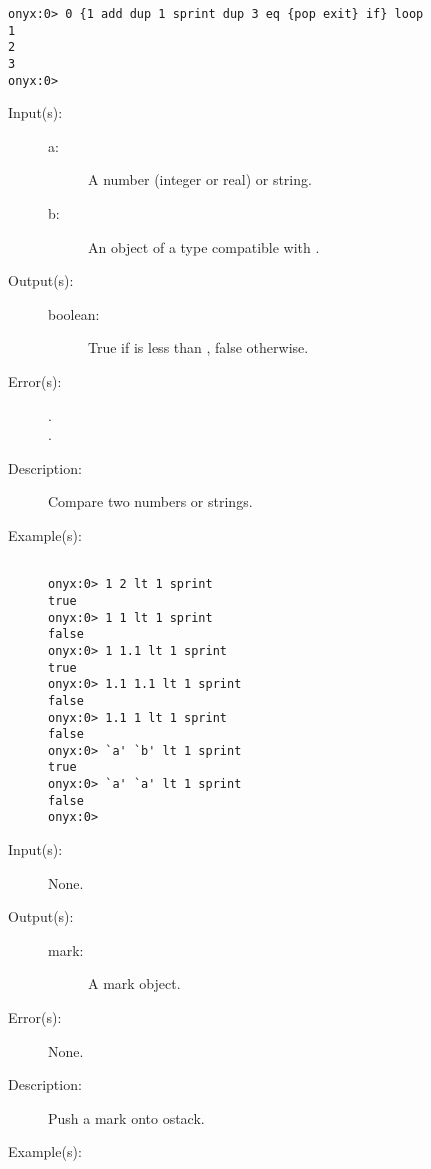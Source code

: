 \begin{description}
\begin{description}
\begin{verbatim}
onyx:0> 0 {1 add dup 1 sprint dup 3 eq {pop exit} if} loop
1
2
3
onyx:0>
		\end{verbatim}
	\end{description}
\label{systemdict:lt}
\item[{\onyxop{a b}{lt}{boolean}}: ]
	\begin{description}\item[]
	\item[Input(s): ]
		\begin{description}\item[]
		\item[a: ]
			A number (integer or real) or string.
		\item[b: ]
			An object of a type compatible with .
		\end{description}
	\item[Output(s): ]
		\begin{description}\item[]
		\item[boolean: ]
			True if  is less than , false
			otherwise.
		\end{description}
	\item[Error(s): ]
		\begin{description}\item[]
		\item[.]
		\item[.]
		\end{description}
	\item[Description: ]
		Compare two numbers or strings.
	\item[Example(s): ]\begin{verbatim}

onyx:0> 1 2 lt 1 sprint
true
onyx:0> 1 1 lt 1 sprint
false
onyx:0> 1 1.1 lt 1 sprint
true
onyx:0> 1.1 1.1 lt 1 sprint
false
onyx:0> 1.1 1 lt 1 sprint
false
onyx:0> `a' `b' lt 1 sprint
true
onyx:0> `a' `a' lt 1 sprint
false
onyx:0>
		\end{verbatim}
	\end{description}
\label{systemdict:mark}
\item[{\onyxop{--}{mark}{mark}}: ]
	\begin{description}\item[]
	\item[Input(s): ] None.
	\item[Output(s): ]
		\begin{description}\item[]
		\item[mark: ]
			A mark object.
		\end{description}
	\item[Error(s): ] None.
	\item[Description: ]
		Push a mark onto ostack.
	\item[Example(s): ]\begin{verbatim}


\end{verbatim}
\end{description}
\end{description}
